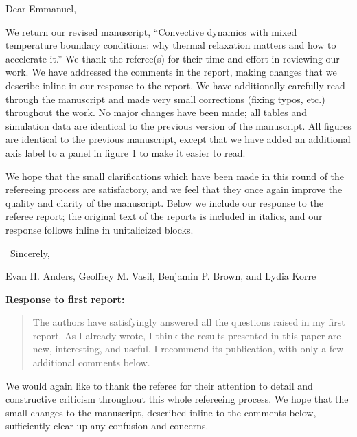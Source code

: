 \documentclass[aps, 11pt, singlecolumn]{revtex4-1} %
\begin{document}
\newenvironment{myquotation}{
\begin{quotation}
\itshape
}{ 
\end{quotation}
}
\noindent
Dear Emmanuel,
$\,$\newline

\begin{singlespace}

We return our revised manuscript, ``Convective dynamics with mixed temperature boundary conditions: why thermal relaxation matters and how to accelerate it.'' 
We thank the referee(s) for their time and effort in reviewing our work.
We have addressed the comments in the report, making changes that we describe inline in our response to the report.
We have additionally carefully read through the manuscript and made very small corrections (fixing typos, etc.) throughout the work.
No major changes have been made; all tables and simulation data are identical to the previous version of the manuscript.
All figures are identical to the previous manuscript, except that we have added an additional axis label to a panel in figure 1 to make it easier to read.

We hope that the small clarifications which have been made in this round of the refereeing process are satisfactory, and we feel that they once again improve the quality and clarity of the manuscript.
Below we include our response to the referee report; the original text of the reports is included in italics, and our response follows inline in unitalicized blocks.

$\,$\newline
\noindent
Sincerely,

Evan H. Anders, Geoffrey M. Vasil, Benjamin P. Brown, and Lydia Korre



\newpage
\noindent
\Large{\textbf{Response to first report:}}\newline$\,$\newline\indent

\begin{myquotation}
The authors have satisfyingly answered all the questions raised in my first report. 
As I already wrote, I think the results presented in this paper are new, interesting, and useful. 
I recommend its publication, with only a few additional comments below.
\end{myquotation}
We would again like to thank the referee for their attention to detail and constructive criticism throughout this whole refereeing process.
We hope that the small changes to the manuscript, described inline to the comments below, sufficiently clear up any confusion and concerns.


\end{singlespace}
\end{document}
